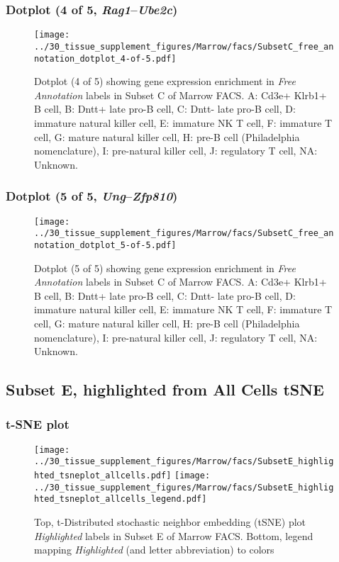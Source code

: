 \clearpage

\subsubsection{Dotplot (4 of 5, \emph{Rag1}--\emph{Ube2c})}
\begin{figure}[h]
\centering
\texttt{[image: ../30\_tissue\_supplement\_figures/Marrow/facs/SubsetC\_free\_annotation\_dotplot\_4-of-5.pdf]}

\caption{ Dotplot (4 of 5)  showing gene expression enrichment in \emph{Free Annotation} labels in Subset C of Marrow FACS. A: Cd3e+ Klrb1+ B cell, B: Dntt+ late pro-B cell, C: Dntt- late pro-B cell, D: immature natural killer cell, E: immature NK T cell, F: immature T cell, G: mature natural killer cell, H: pre-B cell (Philadelphia nomenclature), I: pre-natural killer cell, J: regulatory T cell, NA: Unknown.}
\end{figure}


\clearpage

\subsubsection{Dotplot (5 of 5, \emph{Ung}--\emph{Zfp810})}
\begin{figure}[h]
\centering
\texttt{[image: ../30\_tissue\_supplement\_figures/Marrow/facs/SubsetC\_free\_annotation\_dotplot\_5-of-5.pdf]}

\caption{ Dotplot (5 of 5)  showing gene expression enrichment in \emph{Free Annotation} labels in Subset C of Marrow FACS. A: Cd3e+ Klrb1+ B cell, B: Dntt+ late pro-B cell, C: Dntt- late pro-B cell, D: immature natural killer cell, E: immature NK T cell, F: immature T cell, G: mature natural killer cell, H: pre-B cell (Philadelphia nomenclature), I: pre-natural killer cell, J: regulatory T cell, NA: Unknown.}
\end{figure}


\clearpage
\subsection{Subset E, highlighted from All Cells tSNE}
\subsubsection{t-SNE plot}
\begin{figure}[h]
\centering
\texttt{[image: ../30\_tissue\_supplement\_figures/Marrow/facs/SubsetE\_highlighted\_tsneplot\_allcells.pdf]}
\texttt{[image: ../30\_tissue\_supplement\_figures/Marrow/facs/SubsetE\_highlighted\_tsneplot\_allcells\_legend.pdf]}
\caption{Top, t-Distributed stochastic neighbor embedding (tSNE) plot  \emph{Highlighted} labels in Subset E of Marrow FACS. Bottom, legend mapping \emph{Highlighted} (and letter abbreviation) to colors}
\end{figure}


